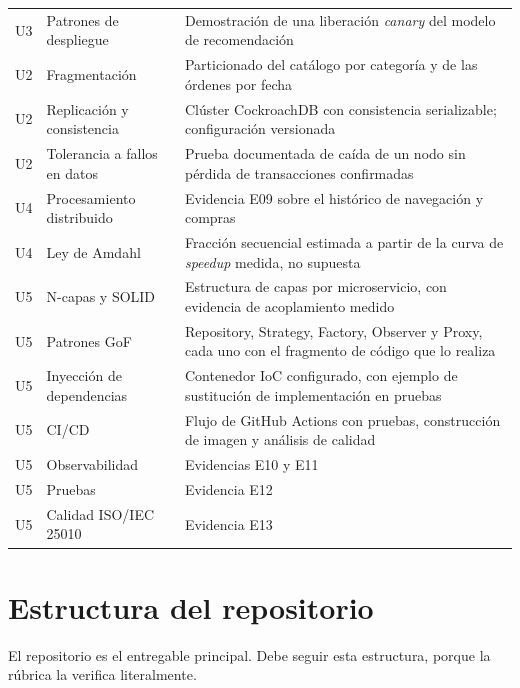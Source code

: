 \documentclass[11pt,a4paper]{article}
\begin{document}
\begin{center}
\begin{longtable}{@{}p{1.2cm}p{5.4cm}p{8.2cm}@{}}
		U3 & Patrones de despliegue & Demostración de una liberación \emph{canary} del modelo de recomendación \\
		\addlinespace
		U2 & Fragmentación & Particionado del catálogo por categoría y de las órdenes por fecha \\
		U2 & Replicación y consistencia & Clúster CockroachDB con consistencia serializable; configuración versionada \\
		U2 & Tolerancia a fallos en datos & Prueba documentada de caída de un nodo sin pérdida de transacciones confirmadas \\
		\addlinespace
		U4 & Procesamiento distribuido & Evidencia E09 sobre el histórico de navegación y compras \\
		U4 & Ley de Amdahl & Fracción secuencial estimada a partir de la curva de \emph{speedup} medida, no supuesta \\
		\addlinespace
		U5 & N-capas y SOLID & Estructura de capas por microservicio, con evidencia de acoplamiento medido \cite{zhong2023measuring} \\
		U5 & Patrones GoF & Repository, Strategy, Factory, Observer y Proxy, cada uno con el fragmento de código que lo realiza \\
		U5 & Inyección de dependencias & Contenedor IoC configurado, con ejemplo de sustitución de implementación en pruebas \\
		U5 & CI/CD & Flujo de GitHub Actions con pruebas, construcción de imagen y análisis de calidad \\
		U5 & Observabilidad & Evidencias E10 y E11 \\
		U5 & Pruebas & Evidencia E12 \\
		U5 & Calidad ISO/IEC 25010 & Evidencia E13 \\
		\bottomrule
	\end{longtable}
\end{center}

\section{Estructura del repositorio}

El repositorio es el entregable principal. Debe seguir esta estructura, porque la rúbrica la verifica literalmente.
\end{document}

